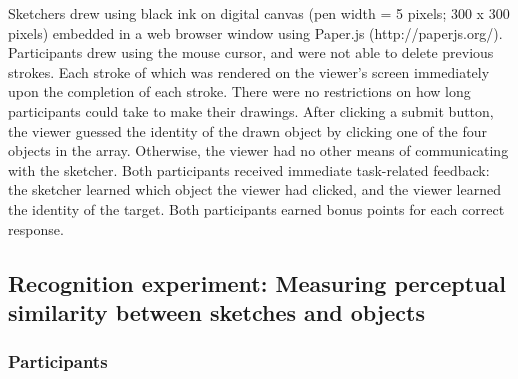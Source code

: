 \documentclass[9pt,twocolumn,twoside]{pnas-new}
\begin{document}
{%
Sketchers drew using black ink on digital canvas (pen width = 5 pixels; 300 x 300 pixels) embedded in a web browser window using Paper.js (http://paperjs.org/). Participants drew using the mouse cursor, and were not able to delete previous strokes. Each stroke of which was rendered on the viewer's screen immediately upon the completion of each stroke. There were no restrictions on how long participants could take to make their drawings. After clicking a submit button, the viewer guessed the identity of the drawn object by clicking one of the four objects in the array. Otherwise, the viewer had no other means of communicating with the sketcher. Both participants received immediate task-related feedback: the sketcher learned which object the viewer had clicked, and the viewer learned the identity of the target. Both participants earned bonus points for each correct response.


\subsection*{Recognition experiment: Measuring perceptual similarity between sketches and objects}

\subsubsection*{Participants}

}
\end{document}
